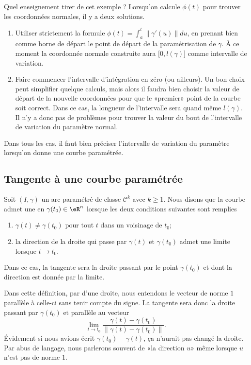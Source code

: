 Quel enseignement tirer de cet exemple ? Lorsqu'on calcule $\phi(t)$ pour trouver les coordonnées normales, il y a deux solutions.
\begin{enumerate}
\item
    Utiliser strictement la formule $\phi(t)=\int_a^t\| \gamma'(u) \|du$, en prenant bien comme borne de départ le point de départ de la paramétrisation de $\gamma$. À ce moment la coordonnée normale construite aura $\mathopen[ 0 , l(\gamma) \mathclose]$ comme intervalle de variation.
\item
    Faire commencer l'intervalle d'intégration en zéro (ou ailleurs). Un bon choix peut simplifier quelque calculs, mais alors il faudra bien choisir la valeur de départ de la nouvelle coordonnées pour que le «premier» point de la courbe soit correct. Dans ce cas, la longueur de l'intervalle sera quand même $l(\gamma)$. Il n'y a donc pas de problèmes pour trouver la valeur du bout de l'intervalle de variation du paramètre normal.
\end{enumerate}
Dans tous les cas, il faut bien préciser l'intervalle de variation du paramètre lorsqu'on donne une courbe paramétrée.

\subsection{Tangente à une courbe paramétrée}

\begin{definition}
Soit $(I,\gamma)$ un arc paramétré de classe $\mathcal{C}^k$ avec $k\geq 1$. Nous disons que la courbe admet une  en $\gamma(t_0)\in\eR^n$ lorsque les deux conditions suivantes sont remplies
\begin{enumerate}
    \item
        $\gamma(t)\neq \gamma(t_0)$ pour tout $t$ dans un voisinage de $t_0$;
    \item
        la direction de la droite qui passe par $\gamma(t)$ et $\gamma(t_0)$ admet une limite lorsque $t\to t_0$.
\end{enumerate}
Dans ce cas, la tangente sera la droite passant par le point $\gamma(t_0)$ et dont la direction est donnée par la limite.
\end{definition}
Dans cette définition, par  d'une droite, nous entendons le vecteur de norme $1$ parallèle à celle-ci sans tenir compte du signe. La tangente sera donc la droite passant par $\gamma(t_0)$ et parallèle au vecteur
\begin{equation}
\lim_{t\to t_0}\frac{ \gamma(t)-\gamma(t_0) }{ \| \gamma(t)-\gamma(t_0) \| }. 
\end{equation}
Évidement si nous avions écrit $\gamma(t_0)-\gamma(t)$, ça n'aurait pas changé la droite. Par abus de langage, nous parlerons souvent de «la direction $u$» même lorsque $u$ n'est pas de norme $1$.

